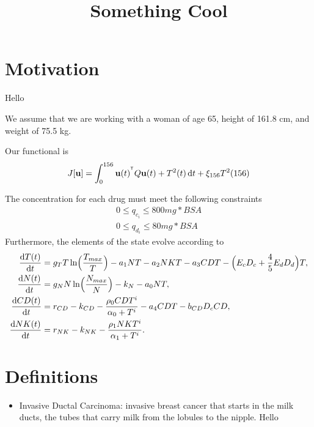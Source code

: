 \documentclass[12pt]{article}
\begin{document}
\title{Something Cool}
\date{\vspace{-9ex}}
\maketitle
\section{Motivation}
Hello

We assume that we are working with a woman of age 65, height of 161.8 cm, and weight of 75.5 kg.


Our functional is 
\begin{align*}
	J[\mathbf{u}] = \int_0^{156}\mathbf{u}(t)^{^{\mathsf T}} Q \mathbf{u}(t)+ T^2(t) \mathop{}\!\mathrm{d} t + \xi_{156} T^2(156)
\end{align*}

The concentration for each drug must meet the following constraints
\begin{align*}
	0 \le q_{c_i} \le 800mg*BSA \\
	0 \le q_{d_i} \le 80mg*BSA
\end{align*}
Furthermore, the elements of the state evolve according to 
\begin{align*}
	\frac{\diff T(t)}{\diff t} &= g_T T \ln \Bigl( \frac{T_{max}}{T} \Bigr)- a_1NT - a_2NKT - a_3CDT - \Bigl(E_c D_c +\frac{4}{5}E_d D_d \Bigr)T, \\
	\frac{\diff N(t)}{\diff t} &= g_N N \ln\Bigl(\frac{N_{max}}{N} \Bigr) - k_N - a_0NT, \\
	\frac{\diff CD(t)}{\diff t} &= r_{CD} - k_{CD} - \frac{\rho_0 CDT ^ i}{\alpha_0 + T^i} - a_4CDT - b_{CD}D_cCD, \\
	\frac{\diff NK(t)}{\diff t} &=r_{NK} - k_{NK} - \frac{\rho _1NKT^i}{\alpha_1 + T^i}. \\
\end{align*}


\appendix
\section{Definitions}
\begin{itemize}
	\item Invasive Ductal Carcinoma: invasive breast cancer that starts in the milk ducts, the tubes that carry milk from the lobules to the nipple. \cite{TypesDePolo}
Hello
\end{itemize}


\end{document}
